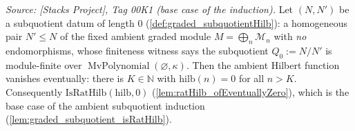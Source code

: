\begin{lemma}

  \label{lem:graded_subquotient_base_eventuallyZero}
  \textit{Source: [Stacks Project], Tag 00K1 (base case of the induction).}
  Let \((N, N')\) be a subquotient datum of length \(0\)
  (\cref{def:graded_subquotientHilb}): a homogeneous pair \(N' \le N\) of the fixed
  ambient graded module \(M = \bigoplus_n \mathcal{M}_n\) with \emph{no} endomorphisms,
  whose finiteness witness says the subquotient \(Q_0 := N/N'\) is module-finite over
  \(\operatorname{MvPolynomial}(\varnothing, \kappa)\). Then the ambient Hilbert
  function vanishes eventually: there is \(K \in \mathbb{N}\) with
  \(\mathrm{hilb}(n) = 0\) for all \(n > K\). Consequently
  \(\mathrm{IsRatHilb}(\mathrm{hilb}, 0)\) (\cref{lem:ratHilb_ofEventuallyZero}),
  which is the base case of the ambient subquotient induction
  (\cref{lem:graded_subquotient_isRatHilb}).
\end{lemma}

